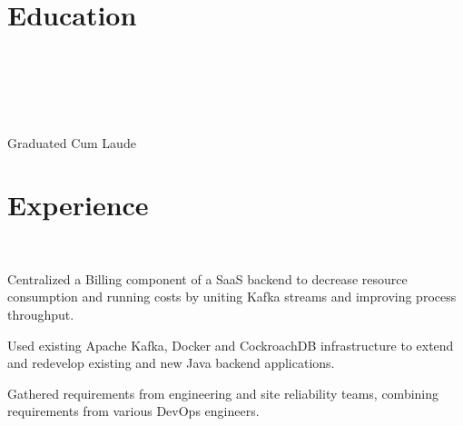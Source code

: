 \documentclass[]{deedy-resume-openfont}
\begin{document}
    
%
%


%
%

\section{Education}
\raggedright

\\ \\
    
\sectionsep

\\ \\
Graduated Cum Laude\\

\sectionsep


%
%
\section{Experience}

\\ 
\begin{tightemize}
	\item Centralized a Billing component of a SaaS backend to decrease resource consumption and running costs by uniting Kafka streams and improving process throughput.
	\item Used existing Apache Kafka, Docker and CockroachDB infrastructure to extend and redevelop existing and new Java backend applications.
	\item Gathered requirements from engineering and site reliability teams, combining requirements from various DevOps engineers.
\end{tightemize}

\sectionsep
\end{document}
